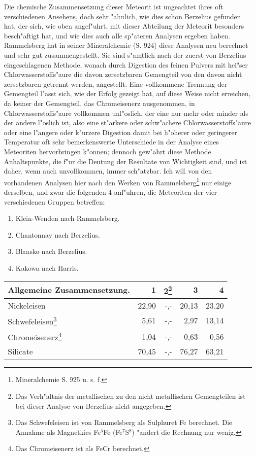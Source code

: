 \documentclass[a4paper, 11pt, oneside]{article}
\begin{document}
Die chemische Zusammensetzung dieser Meteorit ist ungeachtet ihres oft verschiedenen Ansehens, doch sehr "ahnlich, wie dies schon Berzelius gefunden hat, der sich, wie oben angef"uhrt, mit dieser Abteilung der Meteorit besonders besch"aftigt hat, und wie dies auch alle sp"ateren Analysen ergeben haben. Rammelsberg hat in seiner Mineralchemie (S. 924) diese Analysen neu berechnet und sehr gut zusammengestellt. Sie sind s"amtlich nach der zuerst von Berzelius eingeschlagenen Methode, wonach durch Digestion des feinen Pulvers mit hei"ser Chlorwasserstoffs"aure die davon zersetzbaren Gemengteil von den davon nicht zersetzbaren getrennt werden, angestellt. Eine vollkommene Trennung der Gemengteil l"asst sich, wie der Erfolg gezeigt hat, auf diese Weise nicht erreichen, da keiner der Gemengteil, das Chromeisenerz ausgenommen, in Chlorwasserstoffs"aure vollkommen unl"oslich, der eine nur mehr oder minder als der andere l"oslich ist, also eine st"arkere oder schw"achere Chlorwasserstoffs"aure oder eine l"angere oder k"urzere Digestion damit bei h"oherer oder geringerer Temperatur oft sehr bemerkenswerte Unterschiede in der Analyse eines Meteoriten hervorbringen k"onnen; dennoch gew"ahrt diese Methode Anhaltspunkte, die f"ur die Deutung der Resultate von Wichtigkeit sind, und ist daher, wenn auch unvollkommen, immer sch"atzbar. Ich will von den vorhandenen Analysen hier nach den Werken von Rammelsberg\footnote{Mineralchemie S. 925 u. s. f.} nur einige derselben, und zwar die folgenden 4 anf"uhren, die Meteoriten der vier verschiedenen Gruppen betreffen:
\begin{enumerate}
    \item Klein-Wenden nach Rammelsberg.
    \item Chantonnay nach Berzelius.
    \item Blansko nach Berzelius.
    \item Kakowa nach Harris.
\end{enumerate}
\clearpage
\begin{center}
\begin{tabular}{ |l|r|r|r|r| }
    \hline
    Allgemeine Zusammensetzung. & 1 & 2\footnote{Das Verh"altnis der metallischen zu den nicht metallischen Gemengteilen ist bei dieser Analyse von Berzelius nicht angegeben.} & 3 & 4\\
    \hline\hline
    Nickeleisen & 22,90 & -,- & 20,13 & 23,20\\\hline
    Schwefeleisen\footnote{Das Schwefeleisen ist von Rammelsberg als Sulphuret Fe berechnet. Die Annahme als Magnetkies Fe$^{5}$Fe (Fe$^{7}$S$^{8}$) "andert die Rechnung nur wenig.} & 5,61 & -,- & 2,97 & 13,14\\\hline
    Chromeisenerz\footnote{Das Chromeisenerz ist als FeCr berechnet.} & 1,04 & -,- & 0,63 & 0,56\\\hline
    Silicate & 70,45 & -,- & 76,27 & 63,21\\
    \hline
\end{tabular}
\end{center}
\end{document}
